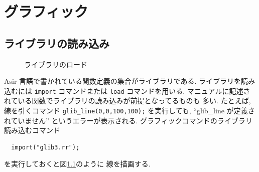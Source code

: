 \documentclass{jbook}
\begin{document}
\chapter{グラフィック}

\section{ライブラリの読み込み}  

\begin{figure}
\begin{center}
\end{center}
\caption{ライブラリのロード} \label{fig:glib_lineImport}
\end{figure}

Asir 言語で書かれている関数定義の集合がライブラリである.
ライブラリを読み込むには {\tt import} コマンドまたは
{\tt load} コマンドを用いる.     
マニュアルに記述されている関数でライブラリの読み込みが前提となってるものも
多い.
たとえば, 線を引くコマンド {\tt glib\_line(0,0,100,100);} 
を実行しても, ``glib\_line が定義されていません''
というエラーが表示される.
グラフィックコマンドのライブラリ読み込むコマンド
\begin{verbatim}
  import("glib3.rr");
\end{verbatim}
を実行しておくと図\ref{fig:glib_lineImport}のように
線を描画する.
\end{document}
